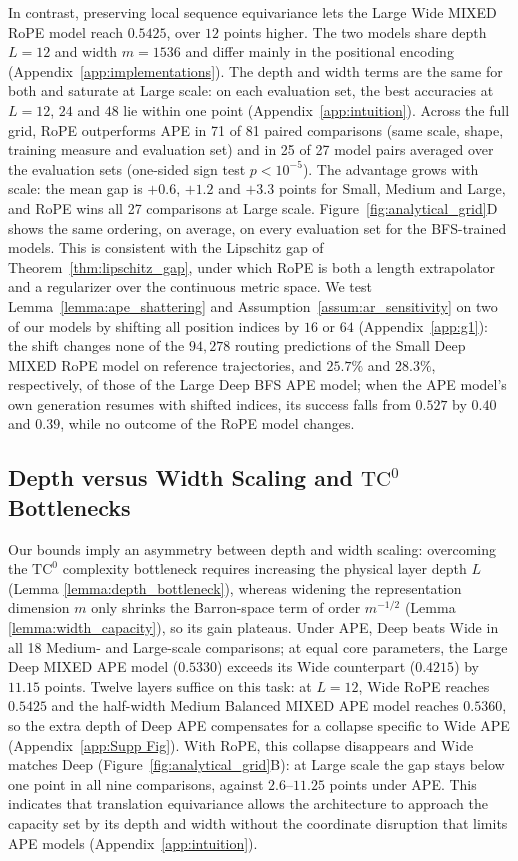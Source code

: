 \documentclass{article}
\begin{document}
In contrast, preserving local sequence equivariance lets the Large Wide MIXED RoPE model reach $0.5425$, over $12$ points higher. The two models share depth $L=12$ and width $m=1536$ and differ mainly in the positional encoding (Appendix~\ref{app:implementations}). %
The depth and width terms are the same for both and saturate at Large scale: on each evaluation set, the best accuracies at $L=12$, $24$ and $48$ lie within one point (Appendix~\ref{app:intuition}). Across the full grid, RoPE outperforms APE in 71 of 81 paired comparisons (same scale, shape, training measure and evaluation set) and in 25 of 27 model pairs averaged over the evaluation sets (one-sided sign test $p<10^{-5}$). The advantage grows with scale: the mean gap is $+0.6$, $+1.2$ and $+3.3$ points for Small, Medium and Large, and RoPE wins all 27 comparisons at Large scale. Figure~\ref{fig:analytical_grid}D shows the same ordering, on average, on every evaluation set for the BFS-trained models. This is consistent with the Lipschitz gap of Theorem~\ref{thm:lipschitz_gap}, under which RoPE is both a length extrapolator and a regularizer over the continuous metric space. We test Lemma~\ref{lemma:ape_shattering} and Assumption~\ref{assum:ar_sensitivity} on two of our models by shifting all position indices by $16$ or $64$ (Appendix~\ref{app:g1}): the shift changes none of the $94{,}278$ routing predictions of the Small Deep MIXED RoPE model on reference trajectories, and $25.7\%$ and $28.3\%$, respectively, of those of the Large Deep BFS APE model; when the APE model's own generation resumes with shifted indices, its success falls from $0.527$ by $0.40$ and $0.39$, while no outcome of the RoPE model changes.

\subsection{Depth versus Width Scaling and \texorpdfstring{$\text{TC}^0$}{TC0} Bottlenecks}

Our bounds imply an asymmetry between depth and width scaling: overcoming the $\text{TC}^0$ complexity bottleneck requires increasing the physical layer depth $L$ (Lemma \ref{lemma:depth_bottleneck}), whereas widening the representation dimension $m$ only shrinks the Barron-space term of order $m^{-1/2}$ (Lemma \ref{lemma:width_capacity}), so its gain plateaus. Under APE, Deep beats Wide in all 18 Medium- and Large-scale comparisons; at equal core parameters, the Large Deep MIXED APE model ($0.5330$) exceeds its Wide counterpart ($0.4215$) by $11.15$ points. Twelve layers suffice on this task: at $L=12$, Wide RoPE reaches $0.5425$ and the half-width Medium Balanced MIXED APE model reaches $0.5360$, so the extra depth of Deep APE compensates for a collapse specific to Wide APE (Appendix~\ref{app:Supp Fig}).
With RoPE, this collapse disappears and Wide matches Deep (Figure~\ref{fig:analytical_grid}B): at Large scale the gap stays below one point in all nine comparisons, against $2.6$--$11.25$ points under APE. This indicates that translation equivariance 
allows the architecture to approach the capacity set by its depth and width without the coordinate disruption that limits APE models (Appendix~\ref{app:intuition}).
\end{document}
